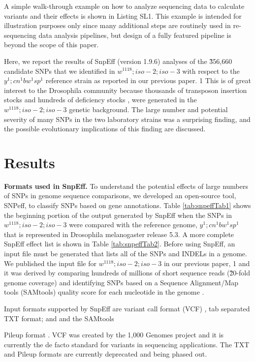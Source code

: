 A simple walk-through example on how to analyze sequencing data to calculate variants and their effects is shown in Listing SL1. This example is intended for illustration purposes only since many additional steps are routinely used in re-sequencing data analysis pipelines, but design of a fully featured pipeline is beyond the scope of this paper.

Here, we report the results of SnpEff (version 1.9.6) analyses of the \~356,660 candidate SNPs that we identified in $w^{1118} ; iso-2; iso-3$ with respect to the $y^1 ; cn^1 bw^1 sp^1$ reference strain as reported in our previous paper. 1 This is of great interest to the Drosophila community because thousands of transposon insertion stocks \cite{thibault2004complementary} and hundreds of deficiency stocks \cite{parks2004systematic},\cite{parks2004systematic} were generated in the $w^{1118} ; iso-2; iso-3$ genetic background. The large number and potential severity of many SNPs in the two laboratory strains was a surprising finding, and the possible evolutionary implications of this finding are discussed.

\section{Results}

\textbf{Formats used in SnpEff.} To understand the potential effects of large numbers of SNPs in genome sequence comparisons, we developed an open-source tool, SNPeff, to classify SNPs based on gene annotations. Table \ref{tab:snpeffTab1} shows the beginning portion of the output generated by SnpEff when the SNPs in $w^{1118} ; iso-2; iso-3$ were compared with the reference genome, $y^1 ; cn^1 bw^1 sp^1$ that is represented in Drosophila melanogaster release 5.3. A more complete SnpEff effect list is shown in Table \ref{tab:snpeffTab2}. Before using SnpEff, an input file must be generated that lists all of the SNPs and INDELs in a genome. We published the input file for $w^{1118} ; iso-2; iso-3$ in our previous paper, 1 and it was derived by comparing hundreds of millions of short sequence reads (\~20-fold genome coverage) and identifying SNPs based on a Sequence Alignment/Map tools (SAMtools) quality score for each nucleotide in the genome \cite{li2011improving}.

Input formats supported by SnpEff are variant call format (VCF) \cite{danecek2011variant}, tab separated TXT format; and and the SAMtools

Pileup format \cite{li2011improving}. VCF was created by the 1,000 Genomes project and it is currently the de facto standard for variants in sequencing applications. The TXT and Pileup formats are currently deprecated and being phased out.

